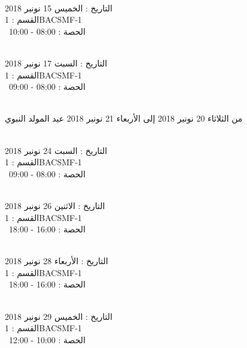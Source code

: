 \documentclass[14pt a4paper twocolumn]{book}
\begin{document}
\par
\noindent\makebox[\linewidth]{\rule{\paperwidth}{0.4pt}}
 \\
التاريخ : الخميس 15 نونبر 2018 \\
القسم : 1BACSMF-1 \\
 \  
الحصة : 08:00 - 10:00 \\
\par
\noindent\makebox[\linewidth]{\rule{\paperwidth}{0.4pt}}
 \\
التاريخ : السبت 17 نونبر 2018 \\
القسم : 1BACSMF-1 \\
 \  
الحصة : 08:00 - 09:00 \\
\par
\noindent\makebox[\linewidth]{\rule{\paperwidth}{0.4pt}}
 \\
من الثلاثاء 20 نونبر 2018 إلى الأربعاء 21 نونبر 2018
\newline
\indent
  عيد المولد النبوي
\par
\noindent\makebox[\linewidth]{\rule{\paperwidth}{0.4pt}}
 \\
التاريخ : السبت 24 نونبر 2018 \\
القسم : 1BACSMF-1 \\
 \  
الحصة : 08:00 - 09:00 \\
\par
\noindent\makebox[\linewidth]{\rule{\paperwidth}{0.4pt}}
 \\
التاريخ : الاثنين 26 نونبر 2018 \\
القسم : 1BACSMF-1 \\
 \  
الحصة : 16:00 - 18:00 \\
\par
\noindent\makebox[\linewidth]{\rule{\paperwidth}{0.4pt}}
 \\
التاريخ : الأربعاء 28 نونبر 2018 \\
القسم : 1BACSMF-1 \\
 \  
الحصة : 16:00 - 18:00 \\
\par
\noindent\makebox[\linewidth]{\rule{\paperwidth}{0.4pt}}
 \\
التاريخ : الخميس 29 نونبر 2018 \\
القسم : 1BACSMF-1 \\
 \  
الحصة : 10:00 - 12:00 \\
\end{document}
